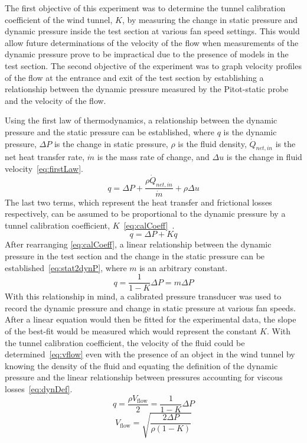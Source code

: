 \documentclass[journal,letterpaper]{IEEEtran}
\begin{document}
The first objective of this experiment was to determine the tunnel calibration coefficient of the wind tunnel, $K$, by measuring the change in static pressure and dynamic pressure inside the test section at various fan speed settings.
This would allow future determinations of the velocity of the flow when measurements of the dynamic pressure prove to be impractical due to the presence of models in the test section.
The second objective of the experiment was to graph velocity profiles of the flow at the entrance and exit of the test section by establishing a relationship between the dynamic pressure measured by the Pitot-static probe and the velocity of the flow.

Using the first law of thermodynamics, a relationship between the dynamic pressure and the static pressure can be established, where $q$ is the dynamic pressure, $\Delta P$ is the change in static pressure, $\rho$ is the fluid density, $\dot{Q}_{net,in}$ is the net heat transfer rate, $\dot{m}$ is the mass rate of change, and $\Delta u$ is the change in fluid velocity~\eqref{eq:firstLaw}.
\begin{equation} \label{eq:firstLaw}
    q = \Delta P + \frac{\rho \dot{Q}_{net,in}}{\dot{m}} + \rho\Delta u
\end{equation}
The last two terms, which represent the heat transfer and frictional losses respectively, can be assumed to be proportional to the dynamic pressure by a tunnel calibration coefficient, $K$~\eqref{eq:calCoeff}~\cite{lecture}.
\begin{equation} \label{eq:calCoeff}
    q = \Delta P + Kq
\end{equation}
After rearranging \eqref{eq:calCoeff}, a linear relationship between the dynamic pressure in the test section and the change in the static pressure can be established~\eqref{eq:stat2dynP}, where $m$ is an arbitrary constant.
\begin{equation} \label{eq:stat2dynP}
    q = \frac{1}{1 - K}\Delta P = m\Delta P
\end{equation}
With this relationship in mind, a calibrated pressure transducer was used to record the dynamic pressure and change in static pressure at various fan speeds.
After a linear equation would then be fitted for the experimental data, the slope of the best-fit would be measured which would represent the constant $K$.
With the tunnel calibration coefficient, the velocity of the fluid could be determined~\eqref{eq:vflow} even with the presence of an object in the wind tunnel by knowing the density of the fluid and equating the definition of the dynamic pressure and the linear relationship between pressures accounting for viscous losses~\eqref{eq:dynDef}.
\begin{equation} \label{eq:dynDef}
    q = \frac{\rho V_\text{flow}}{2} = \frac{1}{1 - K}\Delta P
\end{equation}
\begin{equation} \label{eq:vflow}
    V_\text{flow} = \sqrt{\frac{2\Delta P}{\rho(1 - K)}}
\end{equation}
\end{document}
